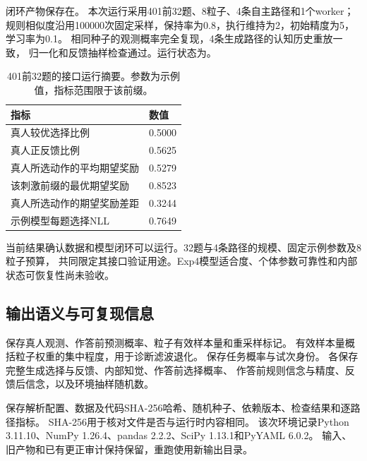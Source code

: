 \documentclass[11pt,a4paper]{article}
\numberwithin{equation}{section}
\begin{document}
闭环产物保存在。
本次运行采用401前32题、8粒子、4条自主路径和1个worker；
规则相似度沿用100000次固定采样，保持率为0.8，执行维持为2，初始精度为5，学习率为0.1。
相同种子的观测概率完全复现，4条生成路径的认知历史重放一致，
归一化和反馈抽样检查通过。运行状态为。

\begin{table}[htbp]
\centering\small
\caption{401前32题的接口运行摘要。参数为示例值，指标范围限于该前缀。}
\begin{tabularx}{\linewidth}{Y L{3cm}}
\toprule 指标 & 数值\\\midrule
真人较优选择比例 & 0.5000\\
真人正反馈比例 & 0.5625\\
真人所选动作的平均期望奖励 & 0.5279\\
该刺激前缀的最优期望奖励 & 0.8523\\
真人所选动作的期望奖励差距 & 0.3244\\
示例模型每题选择NLL & 0.7649\\
\bottomrule
\end{tabularx}
\end{table}

当前结果确认数据和模型闭环可以运行。32题与4条路径的规模、固定示例参数及8粒子预算，
共同限定其接口验证用途。Exp4模型适合度、个体参数可靠性和内部状态可恢复性尚未验收。

\subsection{输出语义与可复现信息}
保存真人观测、作答前预测概率、粒子有效样本量和重采样标记。
有效样本量概括粒子权重的集中程度，用于诊断滤波退化。
保存任务概率与试次身份。
各保存完整生成选择与反馈、内部知觉、作答前选择概率、
作答前规则信念与精度、反馈后信念，以及环境抽样随机数。

保存解析配置、数据及代码SHA-256哈希、随机种子、依赖版本、检查结果和逐路径指标。
SHA-256用于核对文件是否与运行时内容相同。
该次环境记录Python 3.11.10、NumPy 1.26.4、pandas 2.2.2、SciPy 1.13.1和PyYAML 6.0.2。
输入、旧产物和已有更正审计保持保留，重跑使用新输出目录。
\end{document}
